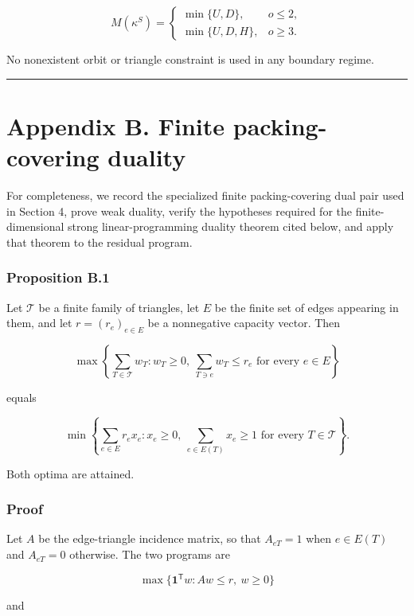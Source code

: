 \documentclass[
  11pt,
]{article}
\begin{document}
\[
M(\kappa^S)
=
\begin{cases}
\min\{U,D\},&o\le2,\\[1mm]
\min\{U,D,H\},&o\ge3.
\end{cases}
\]

No nonexistent orbit or triangle constraint is used in any boundary
regime.

\begin{center}\rule{0.5\linewidth}{0.5pt}\end{center}

\section{Appendix B. Finite packing-covering
duality}\label{appendix-b.-finite-packing-covering-duality}

For completeness, we record the specialized finite packing-covering dual
pair used in Section 4, prove weak duality, verify the hypotheses
required for the finite-dimensional strong linear-programming duality
theorem cited below, and apply that theorem to the residual program.

\subsubsection{Proposition B.1}\label{proposition-b.1}

Let \(\mathcal T\) be a finite family of triangles, let \(E\) be the
finite set of edges appearing in them, and let \(r=(r_e)_{e\in E}\) be a
nonnegative capacity vector. Then

\[
\max\left\{
\sum_{T\in\mathcal T}w_T:
w_T\ge0,\ 
\sum_{T\ni e}w_T\le r_e
\text{ for every }e\in E
\right\}
\]

equals

\[
\min\left\{
\sum_{e\in E}r_ex_e:
x_e\ge0,\ 
\sum_{e\in E(T)}x_e\ge1
\text{ for every }T\in\mathcal T
\right\}.
\]

Both optima are attained.

\subsubsection{Proof}\label{proof-2}

Let \(A\) be the edge-triangle incidence matrix, so that \(A_{eT}=1\)
when \(e\in E(T)\) and \(A_{eT}=0\) otherwise. The two programs are

\[
\max\{\mathbf 1^{\mathsf T}w:Aw\le r,\ w\ge0\}
\]

and
\end{document}
